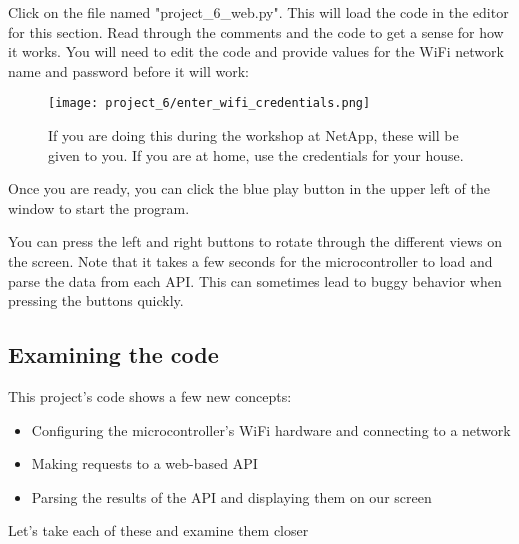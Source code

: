 Click on the file named "project\_6\_web.py". This will load the code in the editor for this section. Read through the comments
and the code to get a sense for how it works. You will need to edit the code and provide values for the WiFi network name
and password before it will work:

\begin{figure}[H]
    \centering
    \texttt{[image: project\_6/enter\_wifi\_credentials.png]}
    \caption{If you are doing this during the workshop at NetApp, these will be given to you. If you are at home, use the credentials for your house.}
\end{figure}

Once you are ready, you can click the blue play button in the upper left of the window
to start the program.

You can press the left and right buttons to rotate through the different views on the screen. Note that it takes
a few seconds for the microcontroller to load and parse the data from each API. This can sometimes lead to
buggy behavior when pressing the buttons quickly.

\subsection{Examining the code}

This project's code shows a few new concepts:
\begin{itemize}
    \item Configuring the microcontroller's WiFi hardware and connecting to a network
    \item Making requests to a web-based API
    \item Parsing the results of the API and displaying them on our screen
\end{itemize}

Let's take each of these and examine them closer


